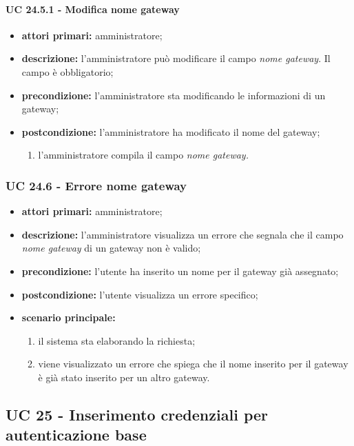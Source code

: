 				\paragraph{UC 24.5.1 - Modifica nome gateway}
				\begin{itemize}
					\item \textbf{attori primari:} amministratore;
					\item \textbf{descrizione:} l'amministratore può modificare il campo \textit{nome gateway}. Il campo è obbligatorio;
					\item \textbf{precondizione:} l'amministratore sta modificando le informazioni di un gateway;
					\item \textbf{postcondizione:} l'amministratore ha modificato il nome del gateway;
					\begin{enumerate}
						\item{l'amministratore compila il campo \textit{nome gateway.}}
					\end{enumerate} 
				\end{itemize}

			\subsubsection{UC 24.6 - Errore nome gateway}
			\begin{itemize}
				\item \textbf{attori primari:} amministratore;
				\item \textbf{descrizione:} l'amministratore visualizza un errore che segnala che il campo \textit{nome gateway} di un gateway non è valido;
				\item \textbf{precondizione:} l'utente ha inserito un nome per il gateway già assegnato;
				\item \textbf{postcondizione:} l'utente visualizza un errore specifico;
				\item \textbf{scenario principale:}
				\begin{enumerate}
					\item il sistema sta elaborando la richiesta;
					\item viene visualizzato un errore che spiega che il nome inserito per il gateway è già stato inserito per un altro gateway.
				\end{enumerate}
			\end{itemize}
			
		\subsection{UC 25 - Inserimento credenziali per autenticazione base}
		
